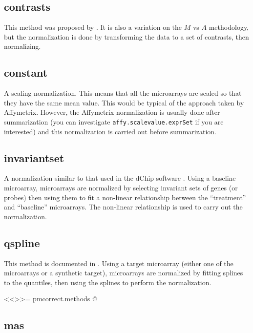 {\subsection{contrasts}

This method was proposed by \cite{astr:2003}. It is also a variation on the  $M$ vs $A$ methodology, but the normalization is done by transforming the data to a set of contrasts, then normalizing.

\subsection{constant}

A scaling normalization. This means that all the microarrays are scaled so that they have the same mean value. This would be typical of the approach taken by Affymetrix. However, the Affymetrix normalization is usually done after summarization (you can investigate \verb+affy.scalevalue.exprSet+ if you are interested) and this normalization is carried out before summarization.

\subsection{invariantset}

A normalization similar to that used in the dChip software \cite{PMID_11134512,PMID_11532216}. Using a baseline microarray, microarrays are normalized by selecting invariant sets of genes (or probes) then using them to fit a non-linear relationship between the ``treatment'' and ``baseline'' microarrays. The non-linear relationship is used to carry out the normalization.

\subsection{qspline}
This method is documented in \cite{workman:etal:2002}. Using a target microarray (either one of the microarrays or a synthetic target), microarrays are normalized by fitting splines to the quantiles, then using the splines to perform the normalization.

<<>>=
pmcorrect.methods
@
\subsection{mas}

}
